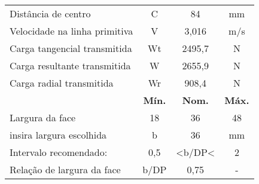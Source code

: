 \begin{table}[]
\begin{tabular}{lccc}
Distância de centro                     & C               & 84              & mm             \\
Velocidade na linha primitiva           & V               & 3,016           & m/s            \\
Carga tangencial transmitida            & Wt              & 2495,7          & N              \\
Carga resultante transmitida            & W               & 2655,9          & N              \\
Carga radial transmitida                & Wr              & 908,4           & N              \\
                                        & \textbf{Mín.}   & \textbf{Nom.}   & \textbf{Máx.}  \\
Largura da face                         & 18              & 36              & 48             \\
insira largura escolhida                & b               & 36              & mm             \\
Intervalo recomendado:                  & 0,5             & <b/DP<          & 2              \\
Relação de largura da face              & b/DP            & 0,75            & -             
\end{tabular}
\end{table}
